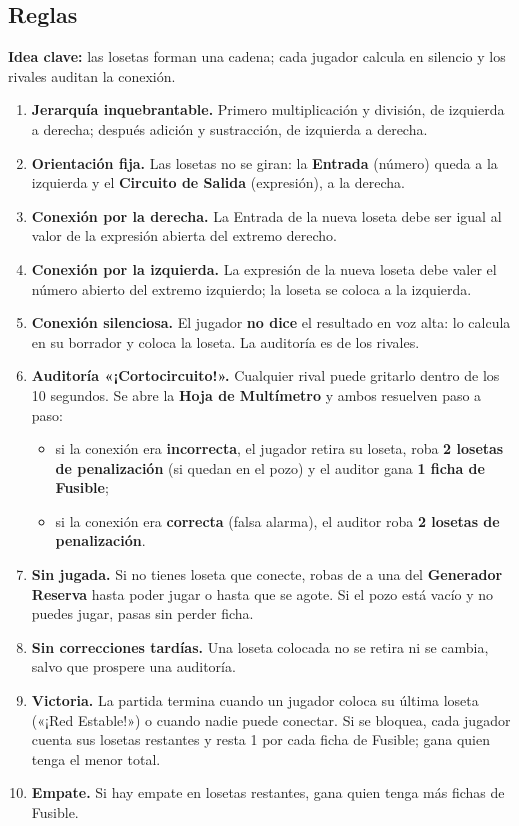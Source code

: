 \documentclass[12pt, letterpaper]{article}
\begin{document}
\subsection{Reglas}

\textbf{Idea clave:} las losetas forman una cadena; cada jugador calcula en silencio y los rivales auditan la conexión.

\begin{enumerate}[leftmargin=*]
  \item \textbf{Jerarquía inquebrantable.} Primero multiplicación y división, de izquierda a derecha; después adición y sustracción, de izquierda a derecha.
  \item \textbf{Orientación fija.} Las losetas no se giran: la \textbf{Entrada} (número) queda a la izquierda y el \textbf{Circuito de Salida} (expresión), a la derecha.
  \item \textbf{Conexión por la derecha.} La Entrada de la nueva loseta debe ser igual al valor de la expresión abierta del extremo derecho.
  \item \textbf{Conexión por la izquierda.} La expresión de la nueva loseta debe valer el número abierto del extremo izquierdo; la loseta se coloca a la izquierda.
  \item \textbf{Conexión silenciosa.} El jugador \textbf{no dice} el resultado en voz alta: lo calcula en su borrador y coloca la loseta. La auditoría es de los rivales.
  \item \textbf{Auditoría «¡Cortocircuito!».} Cualquier rival puede gritarlo dentro de los 10 segundos. Se abre la \textbf{Hoja de Multímetro} y ambos resuelven paso a paso:
  \begin{itemize}
    \item si la conexión era \textbf{incorrecta}, el jugador retira su loseta, roba \textbf{2 losetas de penalización} (si quedan en el pozo) y el auditor gana \textbf{1 ficha de Fusible};
    \item si la conexión era \textbf{correcta} (falsa alarma), el auditor roba \textbf{2 losetas de penalización}.
  \end{itemize}
  \item \textbf{Sin jugada.} Si no tienes loseta que conecte, robas de a una del \textbf{Generador Reserva} hasta poder jugar o hasta que se agote. Si el pozo está vacío y no puedes jugar, pasas sin perder ficha.
  \item \textbf{Sin correcciones tardías.} Una loseta colocada no se retira ni se cambia, salvo que prospere una auditoría.
  \item \textbf{Victoria.} La partida termina cuando un jugador coloca su última loseta («¡Red Estable!») o cuando nadie puede conectar. Si se bloquea, cada jugador cuenta sus losetas restantes y resta 1 por cada ficha de Fusible; gana quien tenga el menor total.
  \item \textbf{Empate.} Si hay empate en losetas restantes, gana quien tenga más fichas de Fusible.
\end{enumerate}
\end{document}
